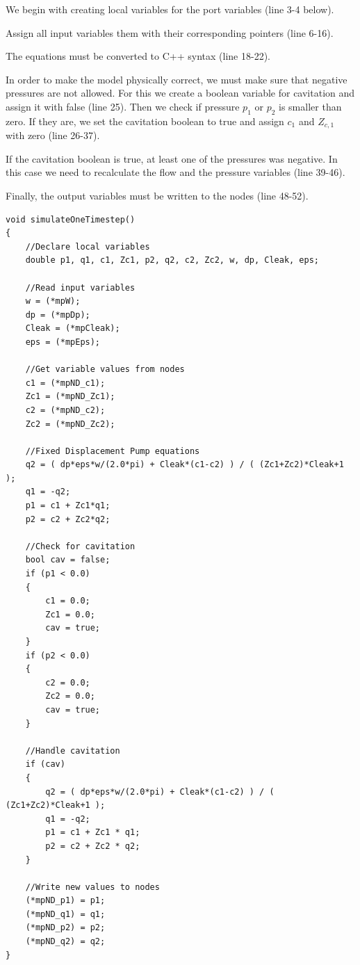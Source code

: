 \documentclass[a4paper,pdftex]{article}
\begin{document}
\begin{tutenumerate}
We begin with creating local variables for the port variables (line 3-4 below).

Assign all input variables them with their corresponding pointers (line 6-16).

The equations must be converted to C++ syntax (line 18-22).

In order to make the model physically correct, we must make sure that negative pressures are not allowed. For this we create a boolean variable for cavitation and assign it with false (line 25). Then we check if pressure $p_{1}$ or $p_{2}$ is smaller than zero. If they are, we set the cavitation boolean to true and assign $c_{1}$ and $Z_{c,1}$ with zero (line 26-37).

If the cavitation boolean is true, at least one of the pressures was negative. In this case we need to recalculate the flow and the pressure variables (line 39-46). 

Finally, the output variables must be written to the nodes (line 48-52).

\end{tutenumerate}

\begin{minipage}{\linewidth}
\begin{lstlisting}[basicstyle=\footnotesize\ttfamily]
void simulateOneTimestep()
{
    //Declare local variables
    double p1, q1, c1, Zc1, p2, q2, c2, Zc2, w, dp, Cleak, eps;

    //Read input variables
    w = (*mpW);
    dp = (*mpDp);
    Cleak = (*mpCleak);
    eps = (*mpEps);

    //Get variable values from nodes
    c1 = (*mpND_c1);
    Zc1 = (*mpND_Zc1);
    c2 = (*mpND_c2);
    Zc2 = (*mpND_Zc2);

    //Fixed Displacement Pump equations
    q2 = ( dp*eps*w/(2.0*pi) + Cleak*(c1-c2) ) / ( (Zc1+Zc2)*Cleak+1 );
    q1 = -q2;
    p1 = c1 + Zc1*q1;
    p2 = c2 + Zc2*q2;

    //Check for cavitation
    bool cav = false;
    if (p1 < 0.0)
    {
        c1 = 0.0;
        Zc1 = 0.0;
        cav = true;
    }
    if (p2 < 0.0)
    {
        c2 = 0.0;
        Zc2 = 0.0;
        cav = true;
    }
    
    //Handle cavitation
    if (cav)
    {
        q2 = ( dp*eps*w/(2.0*pi) + Cleak*(c1-c2) ) / ( (Zc1+Zc2)*Cleak+1 );
		q1 = -q2;
        p1 = c1 + Zc1 * q1;
        p2 = c2 + Zc2 * q2;
    }

    //Write new values to nodes
    (*mpND_p1) = p1;
    (*mpND_q1) = q1;
    (*mpND_p2) = p2;
    (*mpND_q2) = q2;
}
\end{lstlisting}
\end{minipage}
\end{document}
